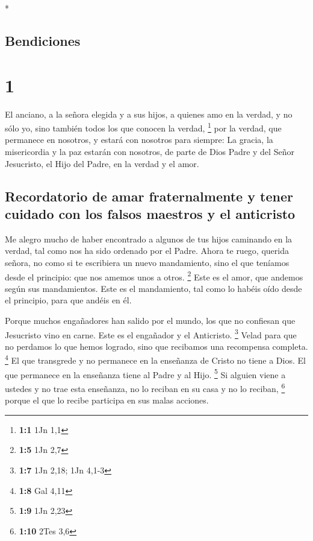 \begin{paracol}{2} \switchcolumn[0]*

\hypertarget{bendiciones}{%
\subsection{Bendiciones}\label{bendiciones}}

\hypertarget{section}{%
\section{1}\label{section}}

 El anciano, a la señora elegida y a sus hijos, a quienes
amo en la verdad, y no sólo yo, sino también todos los que conocen la
verdad, \footnote{\textbf{1:1} 1Jn 1,1}  por la verdad,
que permanece en nosotros, y estará con nosotros para siempre:
 La gracia, la misericordia y la paz estarán con nosotros,
de parte de Dios Padre y del Señor Jesucristo, el Hijo del Padre, en la
verdad y el amor.

\hypertarget{recordatorio-de-amar-fraternalmente-y-tener-cuidado-con-los-falsos-maestros-y-el-anticristo}{%
\subsection{Recordatorio de amar fraternalmente y tener cuidado con los
falsos maestros y el
anticristo}\label{recordatorio-de-amar-fraternalmente-y-tener-cuidado-con-los-falsos-maestros-y-el-anticristo}}

 Me alegro mucho de haber encontrado a algunos de tus
hijos caminando en la verdad, tal como nos ha sido ordenado por el
Padre.  Ahora te ruego, querida señora, no como si te
escribiera un nuevo mandamiento, sino el que teníamos desde el
principio: que nos amemos unos a otros. \footnote{\textbf{1:5} 1Jn 2,7}
 Este es el amor, que andemos según sus mandamientos. Este
es el mandamiento, tal como lo habéis oído desde el principio, para que
andéis en él.

 Porque muchos engañadores han salido por el mundo, los
que no confiesan que Jesucristo vino en carne. Este es el engañador y el
Anticristo. \footnote{\textbf{1:7} 1Jn 2,18; 1Jn 4,1-3} 
Velad para que no perdamos lo que hemos logrado, sino que recibamos una
recompensa completa. \footnote{\textbf{1:8} Gal 4,11}  El
que transgrede y no permanece en la enseñanza de Cristo no tiene a Dios.
El que permanece en la enseñanza tiene al Padre y al Hijo. \footnote{\textbf{1:9}
  1Jn 2,23}  Si alguien viene a ustedes y no trae esta
enseñanza, no lo reciban en su casa y no lo reciban, \footnote{\textbf{1:10}
  2Tes 3,6}  porque el que lo recibe participa en sus
malas acciones.


\end{paracol}
